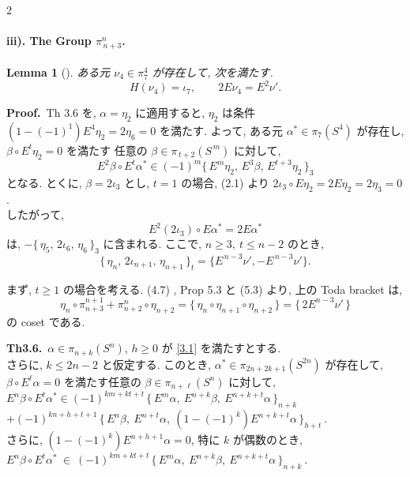 \documentclass[10pt, leqno]{ltjsarticle}
\newcommand{\Ex}{E}        %
\newcommand{\toda}[1]{\{\,#1\,\}}              %
\newcommand{\todai}[2][]{\{\,#2\,\}_{#1}}      %
\newcommand{\gen}[1]{\{\,#1\,\}}       %
\newcommand{\pis}[2]{\pi_{#1}(#2)}       %
\numberwithin{equation}{section}
\theoremstyle{plain}
\newtheorem{lemma}[theorem]{Lemma}
\theoremstyle{definition}
\theoremstyle{remark}
\begin{document}
\begin{paracol}{2}

\bigskip
\paragraph*{iii). The Group \(\pi^{n}_{\,n+3}\).}

\begin{lemma}[]
\label{lem:5.4}
ある元 \(\nu_{4}\in \pi^{4}_{7}\) が存在して, 次を満たす. 
\[
H(\nu_{4})=\iota_7,\qquad 2E \nu_{4}=E^{2}\nu' .
\]
\end{lemma}

\noindent
\textbf{Proof.}\ 
Th 3.6 を, \(\alpha=\eta_{2}\) に適用すると, 
\(\eta_{2}\) は条件 \((1-(-1)^{1})E^{4}\eta_{2}=2\eta_{6}=0\) を満たす. 
よって, ある元 \(\alpha^{\ast}\in\pis{7}{S^4}\) が存在し, \\
\(\beta\circ E^{t}\eta_{2}=0\) を満たす
任意の \(\beta\in\pi_{\,t+2}(S^{\,m})\) に対して,
\[
E^{2}\beta\circ E^t\alpha^{\ast}\in (-1)^m \toda{E^{m}\eta_{2},\,E^{3}\beta,\,E^{t+3}\eta_{2}}_{3}
\]
となる. 
とくに, \(\beta=2\iota_{3}\) とし, \(t=1\) の場合,  (2.1) より
\(2\iota_3\circ E\eta_{2}=2E\eta_{2}=2\eta_3=0\). \\
したがって,
\[
E^{2}(2\iota_{3})\circ E\alpha^{\ast}=2E\alpha^{\ast}
\]
は, \(-\todai[3]{\eta_{5},\,2\iota_{6},\,\eta_{6}}\) に含まれる. 
ここで,
\(n\ge3,\ t\le n-2\) のとき, 
\begin{equation}\label{eq:5.4}
\todai[t]{\eta_{n},\,2\iota_{n+1},\,\eta_{n+1}} = \{E^{\,n-3}\nu',-E^{\,n-3}\nu'\}.
\end{equation}

\noindent
まず, \(t\ge1\) の場合を考える.  
(4.7) , Prop 5.3 と (5.3) より, 
上の Toda bracket は,
\[
\eta_n\circ \pi^{n+1}_{n+3} + \pi^{n}_{n+2}\circ \eta_{n+2} 
= \gen{\eta_n\circ\eta_{n+1}\circ\eta_{n+2}}
= \gen{2E^{n-3}\nu'}
\]
の coset である. 

\switchcolumn

\noindent
\textbf{Th3.6.}\
$\alpha\in\pis{n+k}{S^{n}}$, $h\ge0$ が \eqref{3.1} を満たすとする.\\ 
さらに, $k\le 2n-2$ と仮定する.
このとき,
\(\alpha^{*}\in\pis{2n+2k+1}{S^{2n}}\)
が存在して, \\
\(\beta\circ \Ex^{\ell}\alpha=0\)
を満たす任意の $\beta\in\pis{n+\ell}{S^{n}}$ に対して, \\
\(\Ex^{n}\beta \circ \Ex^{t}\alpha^{*}
\in (-1)^{km+kt+t}\,\todai[n+k]{\Ex^{m}\alpha,\ 
  \Ex^{n+k}\beta,\ \Ex^{n+k+t}\alpha}\)\\
\(+ (-1)^{kn+h+t+1}\,\todai[h+t]{\Ex^{n}\beta,\ 
  \Ex^{n+t}\alpha,\ (1-(-1)^k)\Ex^{n+k+t}\alpha}\ .\)\\
さらに,
\((1-(-1)^k)\Ex^{n+h+1}\alpha=0\), 特に \(k\) が偶数のとき, \\
\(
\Ex^{n}\beta\circ \Ex^{t}\alpha^{*}\ \in\
(-1)^{km+kt+t}\,\todai[n+k]{\Ex^{m}\alpha,\ \Ex^{n+k}\beta,\ \Ex^{n+k+t}\alpha}\ .
\)


\end{paracol}
\end{document}
